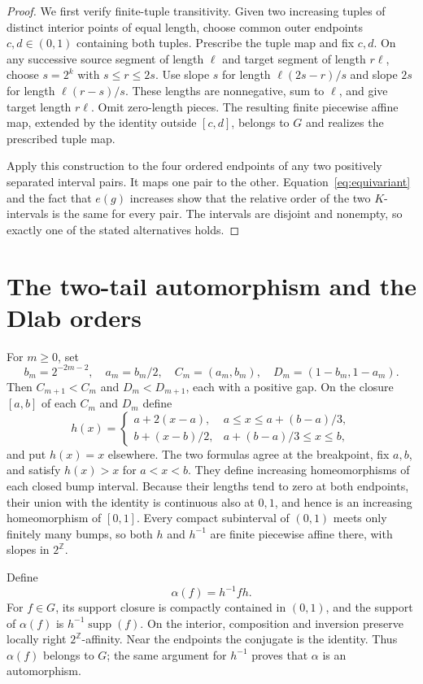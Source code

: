 \documentclass[10pt]{article}
\theoremstyle{definition}
\newcommand{\Z}{\mathbb Z}
\newcommand{\supp}{\operatorname{supp}}
\begin{document}
\begin{proof}
We first verify finite-tuple transitivity. Given two increasing
tuples of distinct interior points of equal length, choose common
outer endpoints $c,d\in(0,1)$ containing both tuples. Prescribe the
tuple map and fix $c,d$. On any successive source segment of length
$\ell$ and target segment of length $r\ell$, choose $s=2^k$ with
$s\le r\le2s$. Use slope $s$ for length $\ell(2s-r)/s$ and slope
$2s$ for length $\ell(r-s)/s$. These lengths are nonnegative, sum
to $\ell$, and give target length $r\ell$. Omit zero-length pieces.
The resulting finite piecewise affine map, extended by the identity
outside $[c,d]$, belongs to $G$ and realizes the prescribed tuple map.

Apply this construction to the four ordered endpoints of any two
positively separated interval pairs. It maps one pair to the other.
Equation~\eqref{eq:equivariant} and the fact that $e(g)$ increases
show that the relative order of the two $K$-intervals is the same
for every pair. The intervals are disjoint and nonempty, so exactly
one of the stated alternatives holds.
\end{proof}

\section{The two-tail automorphism and the Dlab orders}

For $m\ge0$, set
\[
 b_m=2^{-2m-2},\quad a_m=b_m/2,\quad
 C_m=(a_m,b_m),\quad D_m=(1-b_m,1-a_m).
\]
Then $C_{m+1}<C_m$ and $D_m<D_{m+1}$, each with a positive gap.
On the closure $[a,b]$ of each $C_m$ and $D_m$ define
\begin{equation}\label{eq:bump}
 h(x)=
 \begin{cases}
 a+2(x-a),&a\le x\le a+(b-a)/3,\\
 b+(x-b)/2,&a+(b-a)/3\le x\le b,
 \end{cases}
\end{equation}
and put $h(x)=x$ elsewhere. The two formulas agree at the breakpoint,
fix $a,b$, and satisfy $h(x)>x$ for $a<x<b$. They define increasing
homeomorphisms of each closed bump interval. Because their lengths
tend to zero at both endpoints, their union with the identity is
continuous also at $0,1$, and hence is an increasing homeomorphism
of $[0,1]$. Every compact subinterval of $(0,1)$ meets only finitely
many bumps, so both $h$ and $h^{-1}$ are finite piecewise affine
there, with slopes in $2^{\Z}$.

Define
\begin{equation}\label{eq:alpha}
 \alpha(f)=h^{-1}fh.
\end{equation}
For $f\in G$, its support closure is compactly contained in $(0,1)$,
and the support of $\alpha(f)$ is $h^{-1}\supp(f)$. On the interior,
composition and inversion preserve locally right $2^{\Z}$-affinity.
Near the endpoints the conjugate is the identity. Thus $\alpha(f)$
belongs to $G$; the same argument for $h^{-1}$ proves that $\alpha$
is an automorphism.
\end{document}
